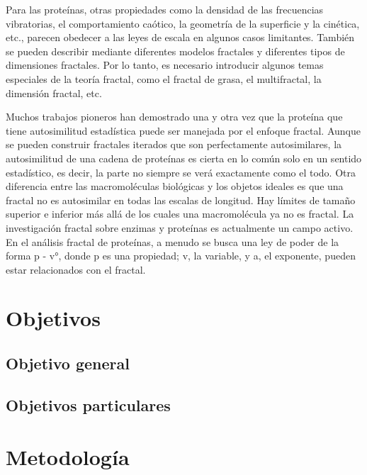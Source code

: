 \documentclass[11pt]{article}
\begin{document}
Para las proteínas, otras propiedades como la densidad de las frecuencias vibratorias, el comportamiento caótico, la geometría de la superficie y la cinética, etc., parecen obedecer a las leyes de escala en algunos casos limitantes. También se pueden describir mediante diferentes modelos fractales y diferentes tipos de dimensiones fractales. Por lo tanto, es necesario introducir algunos temas especiales de la teoría fractal, como el fractal de grasa, el multifractal, la dimensión fractal, etc.

Muchos trabajos pioneros han demostrado una y otra vez que la proteína que tiene autosimilitud estadística puede ser manejada por el enfoque fractal. Aunque se pueden construir fractales iterados que son perfectamente autosimilares, la autosimilitud de una cadena de proteínas es cierta en lo común solo en un sentido estadístico, es decir, la parte no siempre se verá exactamente como el todo. Otra diferencia entre las macromoléculas biológicas y los objetos ideales es que una fractal no es autosimilar en todas las escalas de longitud. Hay límites de tamaño superior e inferior más allá de los cuales una macromolécula ya no es fractal. La investigación fractal sobre enzimas y proteínas es actualmente un campo activo. En el análisis fractal de proteínas, a menudo se busca una ley de poder de la forma p - v°, donde p es una propiedad; v, la variable, y a, el exponente, pueden estar relacionados con el fractal.



\section{Objetivos}
\subsection{Objetivo general}



\subsection{Objetivos particulares}

\section{Metodología}
\end{document}
